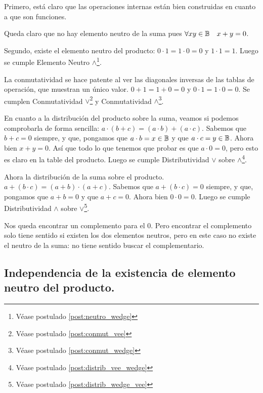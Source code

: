 	Primero, está claro que las operaciones internas están bien construidas
en cuanto a que son funciones.


	Queda claro que no hay elemento neutro de la suma pues \(\forall xy \in
\mathbb{B} \quad x + y = 0\).


	Segundo, existe el elemento neutro del producto: \(0 \cdot 1 = 1 \cdot 0
= 0 \) y \( 1 \cdot 1 = 1 \). Luego se cumple Elemento Neutro $\wedge$\footnote{Véase postulado \ref{post:neutro_wedge}}.



	La conmutatividad se hace patente al ver las diagonales inversas de las
tablas de operación, que muestran un único valor. \( 0 + 1 = 1 + 0 = 0\) y
\(0 \cdot 1 = 1 \cdot 0 = 0\). Se cumplen Conmutatividad $\vee$\footnote{Véase postulado \ref{post:conmut_vee}} y Conmutatividad $\wedge$\footnote{Véase postulado \ref{post:conmut_wedge}}. 



	En cuanto a la distribución del producto sobre la suma, veamos si podemos
comprobarla de forma sencilla: \( a \cdot ( b + c ) = (a \cdot b) + (a \cdot
c) \). Sabemos que \(b + c = 0\) siempre, y que, pongamos que \(a \cdot b = x
\in \mathbb{B}\) y que \(a \cdot c = y \in \mathbb{B}\). Ahora bien \(x + y = 0\). Así
que todo lo que tenemos que probar es que \(a \cdot 0 = 0\), pero esto es
claro en la table del producto. Luego se cumple Distributividad $\vee$ sobre $\wedge$\footnote{Véase postulado \ref{post:distrib_vee_wedge}}.



	Ahora la distribución de la suma sobre el producto. \( a + ( b \cdot c )
= (a + b) \cdot (a + c) \). Sabemos que \(a + (b \cdot c) = 0\) siempre, y
que, pongamos que \( a + b = 0 \) y que \(a + c = 0 \). Ahora bien \(0 \cdot
0 = 0\). Luego se cumple Distributividad $\wedge$ sobre $\vee$\footnote{Véase postulado \ref{post:distrib_wedge_vee}}.


	Nos queda encontrar un complemento para el \(0\). Pero encontrar el
complemento solo tiene sentido si existen los dos elementos neutros, pero en
este caso no existe el neutro de la suma: no tiene sentido buscar el
complementario.



\subsection{Independencia de la existencia de elemento neutro del producto.}



